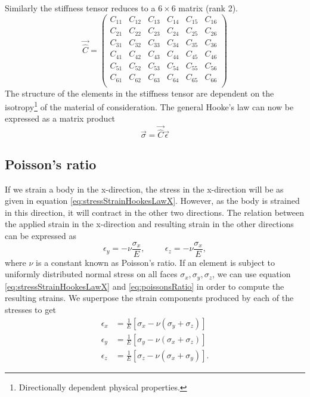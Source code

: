 \documentclass[twoside,english]{uiofysmaster}
\begin{document}
Similarly the stiffness tensor reduces to a $6\times6$ matrix (rank 2).
\begin{equation}
\vec{\hat{C}} = \begin{pmatrix}
C_{11}& C_{12}& C_{13}& C_{14}& C_{15}& C_{16} \\
C_{21}& C_{22}& C_{23}& C_{24}& C_{25}& C_{26} \\
C_{31}& C_{32}& C_{33}& C_{34}& C_{35}& C_{36} \\
C_{41}& C_{42}& C_{43}& C_{44}& C_{45}& C_{46} \\
C_{51}& C_{52}& C_{53}& C_{54}& C_{55}& C_{56} \\
C_{61}& C_{62}& C_{63}& C_{64}& C_{65}& C_{66} \\
\end{pmatrix}
\end{equation} 
The structure of the elements in the stiffness tensor are dependent on the isotropy\footnote{Directionally dependent physical properties.} of the material of consideration.
The general Hooke's law can now be expressed as a matrix product
\begin{equation}
\vec{\sigma} = \vec{\hat{C}}\vec{\epsilon}
\end{equation}

\subsection{Poisson's ratio}
If we strain a body in the x-direction, the stress in the x-direction will be as given in equation \eqref{eq:stressStrainHookesLawX}. However, as the body is strained in this direction, it will contract in the other two directions. 
The relation between the applied strain in the x-direction and resulting strain in the other directions can be expressed as 
\begin{equation}
\epsilon_y = -\nu\frac{\sigma_x}{E}, \hspace{1cm} \epsilon_z = -\nu\frac{\sigma_x}{E} , \label{eq:poissonsRatio}
\end{equation}
where $\nu$ is a constant known as Poisson's ratio. 
If an element is subject to uniformly distributed normal stress on all faces $\sigma_x,\sigma_y,\sigma_z$, we can use equation \eqref{eq:stressStrainHookesLawX} and \eqref{eq:poissonsRatio} in order to compute the resulting strains. 
We superpose the strain components produced by each of the stresses to get
\begin{align}
\epsilon_x &= \frac{1}{E}[\sigma_x - \nu(\sigma_y + \sigma_z)]\\[2mm]
\epsilon_y &= \frac{1}{E}[\sigma_y - \nu(\sigma_x + \sigma_z)]\\[2mm]
\epsilon_z &= \frac{1}{E}[\sigma_z - \nu(\sigma_x + \sigma_y)].
\end{align}
\end{document}
